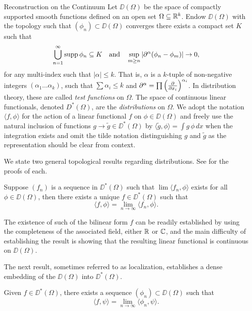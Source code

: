 \begin{chapter}{Reconstruction on the Continuum}
Let $\DD(\Omega)$ be the space of compactly supported smooth functions defined on an open set $\Omega \subseteq \mathbb R^k$.
Endow $\DD(\Omega)$ with the topology such that $(\phi_n)\subset \DD(\Omega)$ converges there exists a compact set $K$ such that 
\begin{equation}
  \bigcup_{n=1}^\infty \operatorname*{supp} \phi_n \subseteq K \quad\text{and}\quad
  \sup_{m\ge n} \left|\partial^\alpha (\phi_n-\phi_m)\right|\to 0, \label{eq:testFunctionContinuity}
\end{equation} 
for any multi-index such that $|\alpha|\le k$.
That is,  $\alpha$ is a $k$-tuple of non-negative integers $(\alpha_1\dots \alpha_k)$, such that $\sum \alpha_i \le k$ and $\partial^\alpha = \prod \left(\frac{\partial}{\partial x_i}\right)^{\alpha_i}$.
In distribution theory, these are called \emph{test functions} on $\Omega$.
The space of continuous linear functionals, denoted $D^*(\Omega)$, are the \emph{distributions} on $\Omega$.
We adopt the notation $\langle f, \phi\rangle$ for the action of a linear functional $f$ on $\phi \in \DD(\Omega)$ and freely use the natural inclusion of functions $g \to \tilde g \in \DD^*(\Omega)$ by $\langle \tilde g, \phi \rangle = \int g\, \phi\,dx$ when the integration exists and omit the tilde notation distinguishing $g$ and $\tilde g$ as the representation should be clear from context. 

We state two general topological results regarding distributions. See \citep[Chapter 2]{hormander1983} for the proofs of each.
\begin{thm} \label{thm:completeness}
  Suppose $(f_n)$ is a sequence in $\DD^*(\Omega)$ such that $\lim\langle f_n,\phi\rangle$ exists for all $\phi \in \DD(\Omega)$, then there exists a unique $f\in \DD^*(\Omega)$ such that
  \begin{equation}
    \langle f, \phi\rangle = \lim_{n\to\infty} \langle f_n, \phi \rangle.
  \end{equation}
\end{thm}
The existence of such of the bilinear form $f$ can be readily established by using the completeness of the associated field, either $\mathbb R$ or $\mathbb C$, and the main difficulty of establishing the result is showing that the resulting linear functional is continuous on $\DD(\Omega)$.

The next result, sometimes referred to as localization, establishes a dense embedding of the $\DD(\Omega)$ into $\DD^*(\Omega)$.
\begin{thm} \label{thm:density}
  Given $f\in \DD^*(\Omega)$, there exists a sequence $(\phi_n) \subset \DD(\Omega)$ such that 
  \begin{equation}
    \langle f,\psi\rangle = \lim_{n\to\infty}\langle \phi_n,\psi\rangle.
  \end{equation}
\end{thm}


\end{chapter}

